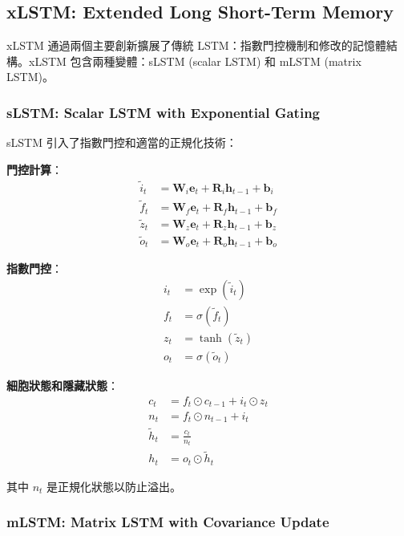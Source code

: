 \documentclass[11pt,a4paper]{article}
\begin{document}
\subsection{xLSTM: Extended Long Short-Term Memory}

xLSTM \cite{beck2024xlstm} 通過兩個主要創新擴展了傳統 LSTM：指數門控機制和修改的記憶體結構。xLSTM 包含兩種變體：sLSTM (scalar LSTM) 和 mLSTM (matrix LSTM)。

\subsubsection{sLSTM: Scalar LSTM with Exponential Gating}

sLSTM 引入了指數門控和適當的正規化技術：

\textbf{門控計算}：
\begin{align}
\tilde{i}_t &= \mathbf{W}_i \mathbf{e}_t + \mathbf{R}_i \mathbf{h}_{t-1} + \mathbf{b}_i \\
\tilde{f}_t &= \mathbf{W}_f \mathbf{e}_t + \mathbf{R}_f \mathbf{h}_{t-1} + \mathbf{b}_f \\
\tilde{z}_t &= \mathbf{W}_z \mathbf{e}_t + \mathbf{R}_z \mathbf{h}_{t-1} + \mathbf{b}_z \\
\tilde{o}_t &= \mathbf{W}_o \mathbf{e}_t + \mathbf{R}_o \mathbf{h}_{t-1} + \mathbf{b}_o
\end{align}

\textbf{指數門控}：
\begin{align}
i_t &= \exp(\tilde{i}_t) \\
f_t &= \sigma(\tilde{f}_t) \\
z_t &= \tanh(\tilde{z}_t) \\
o_t &= \sigma(\tilde{o}_t)
\end{align}

\textbf{細胞狀態和隱藏狀態}：
\begin{align}
c_t &= f_t \odot c_{t-1} + i_t \odot z_t \\
n_t &= f_t \odot n_{t-1} + i_t \\
\tilde{h}_t &= \frac{c_t}{n_t} \\
h_t &= o_t \odot \tilde{h}_t
\end{align}

其中 $n_t$ 是正規化狀態以防止溢出。

\subsubsection{mLSTM: Matrix LSTM with Covariance Update}
\end{document}
